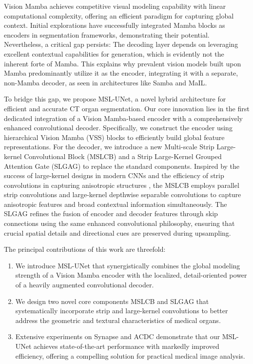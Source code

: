 \documentclass[10pt, a4paper, twocolumn]{article}
\begin{document}
Vision Mamba achieves competitive visual modeling capability with linear computational complexity, offering an efficient paradigm for capturing global context. Initial explorations have successfully integrated Mamba blocks as encoders in segmentation frameworks\cite{ruan2024vmunet,ma2024umamba}, demonstrating their potential. Nevertheless, a critical gap persists: The decoding layer depends on leveraging excellent contextual capabilities for generation, which is evidently not the inherent forte of Mamba. This explains why prevalent vision models built upon Mamba predominantly utilize it as the encoder, integrating it with a separate, non-Mamba decoder, as seen in architectures like Samba\cite{Smamba} and MaIL\cite{MaIL}.

To bridge this gap, we propose MSL-UNet, a novel hybrid architecture for efficient and accurate CT organ segmentation. Our core innovation lies in the first dedicated integration of a Vision Mamba-based encoder with a comprehensively enhanced convolutional decoder. Specifically, we construct the encoder using hierarchical Vision Mamba (VSS) blocks to efficiently build global feature representations. For the decoder, we introduce a new Multi-scale Strip Large-kernel Convolutional Block (MSLCB) and a Strip Large-Kernel Grouped Attention Gate (SLGAG) to replace the standard components. Inspired by the success of large-kernel designs in modern CNNs \cite{liu2022convnext} and the efficiency of strip convolutions in capturing anisotropic structures \cite{hou2020strippooling}, the MSLCB employs parallel strip convolutions and large-kernel depthwise separable convolutions to capture anisotropic features and broad contextual information simultaneously. The SLGAG refines the fusion of encoder and decoder features through skip connections using the same enhanced convolutional philosophy, ensuring that crucial spatial details and directional cues are preserved during upsampling.

The principal contributions of this work are threefold: 
\begin{enumerate}
\item We introduce MSL-UNet that synergistically combines the global modeling strength of a Vision Mamba encoder with the localized, detail-oriented power of a heavily augmented convolutional decoder. 
\item We design two novel core components MSLCB and SLGAG that systematically incorporate strip and large-kernel convolutions to better address the geometric and textural characteristics of medical organs. 
\item Extensive experiments on Synapse and ACDC demonstrate that our MSL-UNet achieves state-of-the-art performance with markedly improved efficiency, offering a compelling solution for practical medical image analysis.
\end{enumerate}
\end{document}
